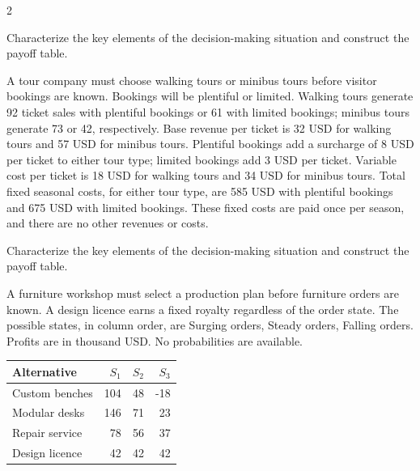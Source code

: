 \begin{multicols}{2}
\begin{minipage}{\linewidth}
Characterize the key elements of the decision-making situation  
and construct the payoff table. 

\end{minipage}\par

\begin{minipage}{\linewidth}
A tour company must choose walking tours or minibus tours before visitor bookings are known. Bookings will be plentiful or limited. Walking tours generate 92 ticket sales with plentiful bookings or 61 with limited bookings; minibus tours generate 73 or 42, respectively. Base revenue per ticket is 32 USD for walking tours and 57 USD for minibus tours. Plentiful bookings add a surcharge of 8 USD per ticket to either tour type; limited bookings add 3 USD per ticket. Variable cost per ticket is 18 USD for walking tours and 34 USD for minibus tours. Total fixed seasonal costs, for either tour type, are 585 USD with plentiful bookings and 675 USD with limited bookings. These fixed costs are paid once per season, and there are no other revenues or costs.

Characterize the key elements of the decision-making situation  
and construct the payoff table. 
\end{minipage}\par

\begin{minipage}{\linewidth}
A furniture workshop must select a production plan before furniture orders are known. A design licence earns a fixed royalty regardless of the order state. The possible states, in column order, are Surging orders, Steady orders, Falling orders. Profits are in thousand USD. No probabilities are available.
\begin{center}\small\setlength{\tabcolsep}{4pt}
\begin{tabular}{@{}lrrr@{}}\toprule
Alternative&$S_1$&$S_2$&$S_3$\\\midrule
Custom benches&104&48&-18\\
Modular desks&146&71&23\\
Repair service&78&56&37\\
Design licence&42&42&42\\\bottomrule
\end{tabular}\end{center}


\end{minipage}
\end{multicols}
